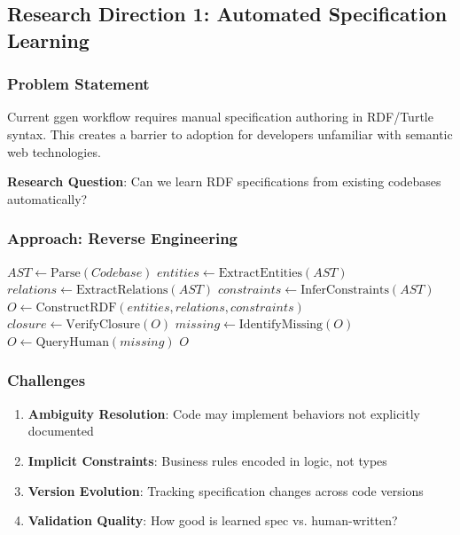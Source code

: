 \subsection{Research Direction 1: Automated Specification Learning}

\subsubsection{Problem Statement}

Current ggen workflow requires manual specification authoring in RDF/Turtle syntax. This creates a barrier to adoption for developers unfamiliar with semantic web technologies.

\textbf{Research Question}: Can we learn RDF specifications from existing codebases automatically?

\subsubsection{Approach: Reverse Engineering}

\begin{algorithm}
\caption{Specification Extraction from Code}
\begin{algorithmic}[1]
    \State $AST \gets \text{Parse}(Codebase)$
    \State $entities \gets \text{ExtractEntities}(AST)$ 
    \State $relations \gets \text{ExtractRelations}(AST)$ 
    \State $constraints \gets \text{InferConstraints}(AST)$ 
    \State $O \gets \text{ConstructRDF}(entities, relations, constraints)$
    \State $closure \gets \text{VerifyClosure}(O)$
        \State $missing \gets \text{IdentifyMissing}(O)$
        \State $O \gets \text{QueryHuman}(missing)$ 
    \EndIf
    \State \Return $O$
\EndProcedure
\end{algorithmic}
\end{algorithm}

\subsubsection{Challenges}

\begin{enumerate}
    \item \textbf{Ambiguity Resolution}: Code may implement behaviors not explicitly documented
    \item \textbf{Implicit Constraints}: Business rules encoded in logic, not types
    \item \textbf{Version Evolution}: Tracking specification changes across code versions
    \item \textbf{Validation Quality}: How good is learned spec vs. human-written?
\end{enumerate}

